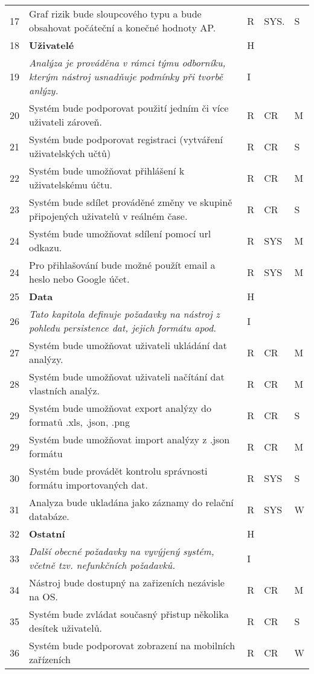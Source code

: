 \begin{longtable}{|p{0.5cm} | p{12cm} | p{0.5cm} | p{0.75cm} | p{0.5cm} |}
17 & Graf rizik bude sloupcového typu a bude obsahovat počáteční a konečné hodnoty AP. &	R&	SYS. &S\\
 18 &	\textbf{Uživatelé}  &	H & & \\
19 &	\textit{Analýza je prováděna v rámci týmu odborníku, kterým nástroj usnadňuje podmínky při tvorbě anlýzy.
} &	I	&& \\
20 &	Systém bude podporovat použití jedním či více uživateli zároveň.&	R&	CR&M\\
21&	Systém bude podporovat registraci (vytváření uživatelských učtů)	&R	&CR&S\\
22&	Systém bude umožňovat přihlášení k uživatelskému účtu.&	R&	CR&M\\
23&		Systém bude sdílet prováděné změny ve skupině připojených uživatelů v reálném čase. &	R&	CR&S\\
24&		Systém bude umožňovat sdílení pomocí url odkazu.&	R&	SYS&M\\
24&		Pro přihlašování bude možné použít email a heslo nebo Google účet. &	R&	SYS&M\\


25 &	\textbf{Data}  &	H & & \\
26 &	\textit{Tato kapitola definuje požadavky na nástroj z pohledu persistence dat, jejich formátu apod.} &	I	&& \\
27 &	Systém bude umožňovat uživateli ukládání dat analýzy. &	R&	CR&M\\
28 &	Systém bude umožňovat uživateli načítání dat vlastních analýz. &	R&	CR&M\\
29 &	Systém bude umožňovat export analýzy do formatů .xls, .json, .png &	R &	CR & S\\
29 &	Systém bude umožňovat import analýzy z .json formátu &	R &	CR & M\\
30 &	Systém bude provádět kontrolu správnosti formátu importovaných dat. & 	R &	SYS & S\\
31 &	Analyza bude ukladána jako záznamy do relační databáze.& 	R&	SYS&W\\
32&	\textbf{Ostatní}  &	H & & \\
33 &	\textit{Další obecné požadavky na vyvýjený systém, včetně tzv. nefunkčních požadavků.} &	I	&& \\
34	& Nástroj bude dostupný na zařizeních nezávisle na OS. &	R&	CR& M\\
35	& Systém bude zvládat současný přistup několika desítek uživatelů. &	R&	CR& S\\
36	& Systém bude podporovat zobrazení na mobilních zařízeních	&R	&CR&W\\ \hline
\end{longtable}

